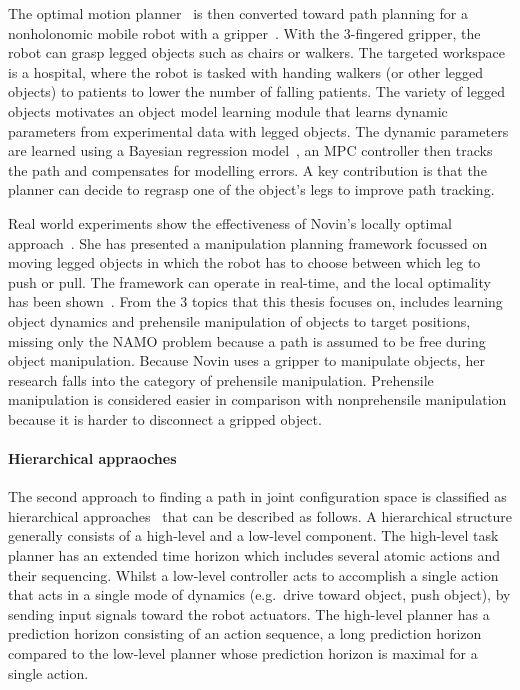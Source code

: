 The optimal motion planner~\cite{sabbaghnovin_optimal_2016} is then converted toward path planning for a nonholonomic mobile robot with a gripper~\cite{novin_dynamic_2018}. With the 3-fingered gripper, the robot can grasp legged objects such as chairs or walkers. The targeted workspace is a hospital, where the robot is tasked with handing walkers (or other legged objects) to patients to lower the number of falling patients. The variety of legged objects motivates an object model learning module that learns dynamic parameters from experimental data with legged objects. The dynamic parameters are learned using a Bayesian regression model~\cite{scholz_navigation_2016}, an \ac{MPC} controller then tracks the path and compensates for modelling errors. A key contribution is that the planner can decide to regrasp one of the object's legs to improve path tracking.\bs

Real world experiments show the effectiveness of Novin's locally optimal approach~\cite{sabbaghnovin_model_2021}. She has presented a manipulation planning framework focussed on moving legged objects in which the robot has to choose between which leg to push or pull. The framework can operate in real-time, and the local optimality has been shown~\cite{sabbaghnovin_model_2021}. From the 3 topics that this thesis focuses on, \citeauthor{sabbaghnovin_model_2021} includes learning object dynamics and prehensile manipulation of objects to target positions, missing only the \ac{NAMO} problem because a path is assumed to be free during object manipulation. Because Novin uses a gripper to manipulate objects, her research falls into the category of prehensile manipulation. Prehensile manipulation is considered easier in comparison with nonprehensile manipulation because it is harder to disconnect a gripped object.\bs


\paragraph{Hierarchical appraoches}
The second approach to finding a path in joint configuration space is classified as hierarchical approaches~\cite{ellis_navigation_2022,krontiris_dealing_2015,scholz_navigation_2016,vega-brown_asymptotically_2020,wang_affordancebased_2020} that can be described as follows. A hierarchical structure generally consists of a high-level and a low-level component. The high-level task planner has an extended time horizon which includes several atomic actions and their sequencing. Whilst a low-level controller acts to accomplish a single action that acts in a single mode of dynamics (e.g.~drive toward object, push object), by sending input signals toward the robot actuators. The high-level planner has a prediction horizon consisting of an action sequence, a long prediction horizon compared to the low-level planner whose prediction horizon is maximal for a single action.\bs

